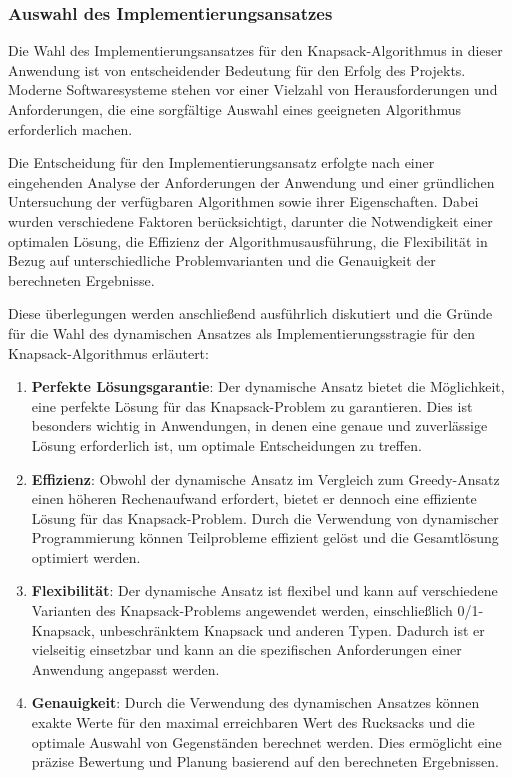 \subsubsection{Auswahl des Implementierungsansatzes}
Die Wahl des Implementierungsansatzes für den Knapsack-Algorithmus in dieser Anwendung ist von entscheidender Bedeutung
für den Erfolg des Projekts. Moderne Softwaresysteme stehen vor einer Vielzahl von Herausforderungen und Anforderungen,
die eine sorgfältige Auswahl eines geeigneten Algorithmus erforderlich machen.

Die Entscheidung für den Implementierungsansatz erfolgte nach einer eingehenden Analyse der Anforderungen der Anwendung
und einer gründlichen Untersuchung der verfügbaren Algorithmen sowie ihrer Eigenschaften. Dabei wurden verschiedene
Faktoren berücksichtigt, darunter die Notwendigkeit einer optimalen Lösung, die Effizienz der Algorithmusausführung, die
Flexibilität in Bezug auf unterschiedliche Problemvarianten und die Genauigkeit der berechneten Ergebnisse.

Diese überlegungen werden anschließend ausführlich diskutiert und die Gründe für die Wahl des dynamischen Ansatzes als
Implementierungsstragie für den Knapsack-Algorithmus erläutert:
\begin{enumerate}
\item \textbf{Perfekte Lösungsgarantie}: Der dynamische Ansatz bietet die Möglichkeit, eine perfekte Lösung für das
Knapsack-Problem zu garantieren. Dies ist besonders wichtig in Anwendungen, in denen eine genaue und zuverlässige
Lösung erforderlich ist, um optimale Entscheidungen zu treffen.
\item \textbf{Effizienz}: Obwohl der dynamische Ansatz im Vergleich zum Greedy-Ansatz einen höheren Rechenaufwand
erfordert, bietet er dennoch eine effiziente Lösung für das Knapsack-Problem. Durch die Verwendung von dynamischer
Programmierung können Teilprobleme effizient gelöst und die Gesamtlösung optimiert werden.
\item \textbf{Flexibilität}: Der dynamische Ansatz ist flexibel und kann auf verschiedene Varianten des Knapsack-Problems
angewendet werden, einschließlich 0/1-Knapsack, unbeschränktem Knapsack und anderen Typen. Dadurch ist er vielseitig
einsetzbar und kann an die spezifischen Anforderungen einer Anwendung angepasst werden.
\item \textbf{Genauigkeit}: Durch die Verwendung des dynamischen Ansatzes können exakte Werte für den maximal erreichbaren
Wert des Rucksacks und die optimale Auswahl von Gegenständen berechnet werden. Dies ermöglicht eine präzise Bewertung
und Planung basierend auf den berechneten Ergebnissen.
\end{enumerate}

